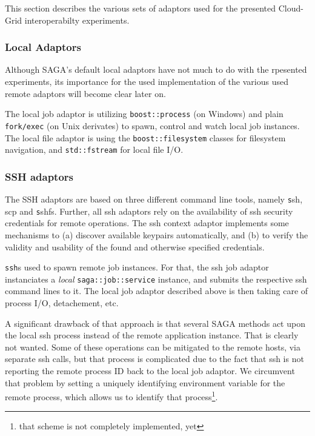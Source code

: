 \documentclass[conference,final]{IEEEtran}
\newcommand{\T}[1]{\texttt{#1}}
\newcommand{\I}[1]{\textit{#1}}
\newcommand{\ssh}[1]{\texttt{ssh}}
\begin{document}
This section describes the various sets of adaptors used for the
presented Cloud-Grid interoperabilty experiments.


 \subsubsection{Local Adaptors}

  Although SAGA's default local adaptors have not much to do with the
  rpesented experiments, its importance for the used implementation of
  the various used remote adaptors will become clear later on.

  The local job adaptor is utilizing \T{boost::process} (on Windows)
  and plain \T{fork/exec} (on Unix derivates) to spawn, control and
  watch local job instances.  The local file adaptor is using the
  \T{boost::filesystem} classes for filesystem navigation, and
  \T{std::fstream} for local file I/O. %


 \subsubsection{SSH adaptors}

 The SSH adaptors are based on three different command line tools,
 namely {\texttt ssh, scp} and {\texttt sshfs}.  Further, all ssh
 adaptors rely on the availability of ssh security credentials for
 remote operations.  The ssh context adaptor implements some
 mechanisms to (a) discover available keypairs automatically, and (b)
 to verify the validity and usability of the found and otherwise
 specified credentials.
  
  \ssh is used to spawn remote job instances.  For that, the ssh job
  adaptor instanciates a \I{local} \T{saga::job::service} instance,
  and submits the respective ssh command lines to it.  The local job
  adaptor described above is then taking care of process I/O,
  detachement, etc.

  A significant drawback of that approach is that several SAGA methods
  act upon the local ssh process instead of the remote application
  instance.  That is clearly not wanted.  Some of these operations can
  be mitigated to the remote hosts, via separate ssh calls, but that
  process is complicated due to the fact that ssh is not reporting the
  remote process ID back to the local job adaptor.  We circumvent that
  problem by setting a uniquely identifying environment variable for
  the remote process, which allows us to identify that
  process\footnote{that scheme is not completely implemented, yet}.
\end{document}
